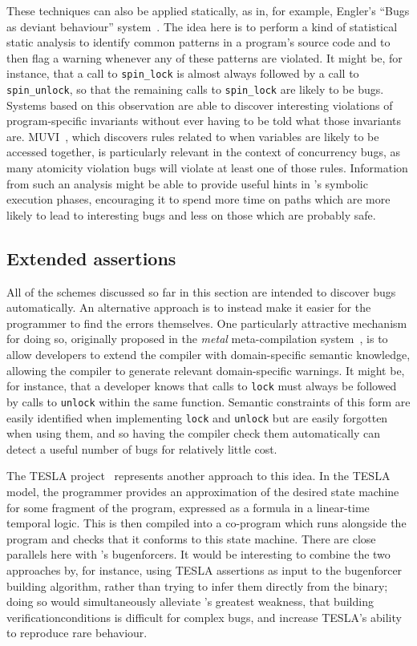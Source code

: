 These techniques can also be applied statically, as in, for example,
Engler's ``Bugs as deviant behaviour'' system~\cite{Engler2001}.  The
idea here is to perform a kind of statistical static analysis to
identify common patterns in a program's source code and to then flag a
warning whenever any of these patterns are violated.  It might be, for
instance, that a call to \texttt{spin\_lock} is almost always followed
by a call to \texttt{spin\_unlock}, so that the remaining calls to
\texttt{spin\_lock} are likely to be bugs.  Systems based on this
observation are able to discover interesting violations of
program-specific invariants without ever having to be told what those
invariants are.  MUVI~\cite{Lu2007}, which discovers rules related to
when variables are likely to be accessed together, is particularly
relevant in the context of concurrency bugs, as many atomicity
violation bugs will violate at least one of those rules.  Information
from such an analysis might be able to provide useful hints in
{\technique}'s symbolic execution phases, encouraging it to spend more
time on paths which are more likely to lead to interesting bugs and
less on those which are probably safe.

\subsection{Extended assertions}

All of the schemes discussed so far in this section are intended to
discover bugs automatically.  An alternative approach is to instead
make it easier for the programmer to find the errors themselves.  One
particularly attractive mechanism for doing so, originally proposed in
the \textit{metal} meta-compilation system~\cite{Engler2000a}, is to
allow developers to extend the compiler with domain-specific semantic
knowledge, allowing the compiler to generate relevant domain-specific
warnings.  It might be, for instance, that a developer knows that
calls to \texttt{lock} must always be followed by calls to
\texttt{unlock} within the same function.  Semantic constraints of
this form are easily identified when implementing \texttt{lock} and
\texttt{unlock} but are easily forgotten when using them, and so
having the compiler check them automatically can detect a useful
number of bugs for relatively little cost.

The TESLA project~\cite{Locielski2011,Watson2013} represents another approach to this idea.  In the
TESLA model, the programmer provides an approximation of the desired
state machine for some fragment of the program, expressed as a formula
in a linear-time temporal logic.  This is then compiled into a
co-program which runs alongside the program and checks that it
conforms to this state machine.  There are close parallels here with
{\technique}'s \glspl{bugenforcer}.  It would be interesting to
combine the two approaches by, for instance, using TESLA assertions as
input to the \gls{bugenforcer} building algorithm, rather than trying
to infer them directly from the binary; doing so would simultaneously
alleviate {\technique}'s greatest weakness, that building
\glspl{verificationcondition} is difficult for complex bugs, and
increase TESLA's ability to reproduce rare behaviour.

